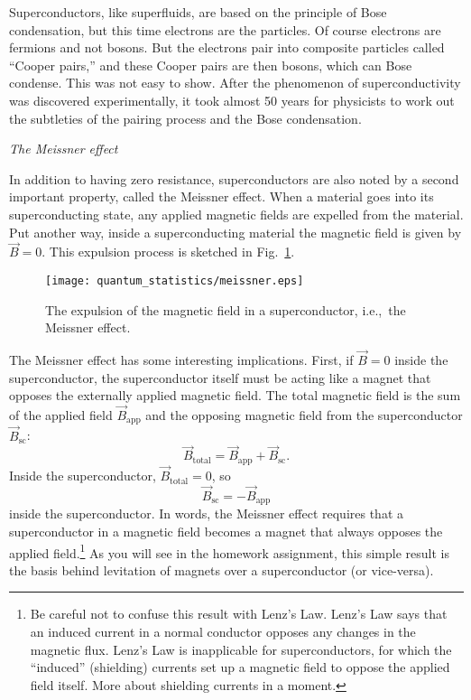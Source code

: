Superconductors, like superfluids, are based on the principle of Bose
condensation, but this time electrons are the particles.  Of course
electrons are fermions and not bosons.  But the electrons pair into
composite particles called ``Cooper pairs,'' and these Cooper pairs
are then bosons, which can Bose condense.  This was not easy to show.
After the phenomenon of superconductivity was discovered
experimentally, it took almost 50 years for physicists to work out the
subtleties of the pairing process and the Bose condensation.




\bigskip
\noindent\textit{The Meissner effect}
\medskip

In addition to having zero resistance, superconductors are also noted
by a second important property, called the Meissner effect.  When a
material goes into its superconducting state, any applied magnetic
fields are expelled from the material.  Put another way, inside a
superconducting material the magnetic field is given by $\vec B=0$.
This expulsion process is sketched in Fig.~\ref{fig:meissner}.

\begin{figure}[tbp]
\begin{center}
\texttt{[image: quantum\_statistics/meissner.eps]}
\caption{The expulsion of the magnetic field in a superconductor, i.e.,\
the Meissner effect.}
\label{fig:meissner}
\end{center}
\end{figure}

The Meissner effect has some interesting implications.  First, if
$\vec B= 0$ inside the superconductor, the superconductor itself must
be acting like a magnet that opposes the externally applied magnetic
field.  The total magnetic field is the sum of the applied field
$\vec B_\text{app}$ and the opposing magnetic field from the
superconductor $\vec B_\text{sc}$:
\begin{equation}
\vec B_\text{total} = \vec B_\text{app} + \vec B_\text{sc}.
\end{equation}
Inside the superconductor, $\vec B_\text{total} = 0$, so
\begin{equation}
\vec B_\text{sc} = -\vec B_\text{app}
\end{equation}
inside the superconductor.  In words, the Meissner effect requires
that a superconductor in a magnetic field becomes a magnet that always
opposes the applied field.\footnote{Be careful not to confuse this
result with Lenz's Law.  Lenz's Law says that an induced current in a
normal conductor opposes any changes in the magnetic flux.  Lenz's Law
is inapplicable for superconductors, for which the ``induced''
(shielding) currents set up a magnetic field to oppose the applied
field itself.  More about shielding currents in a moment.} As you
will see in the homework assignment, this simple result is the basis
behind levitation of magnets over a superconductor (or vice-versa).

